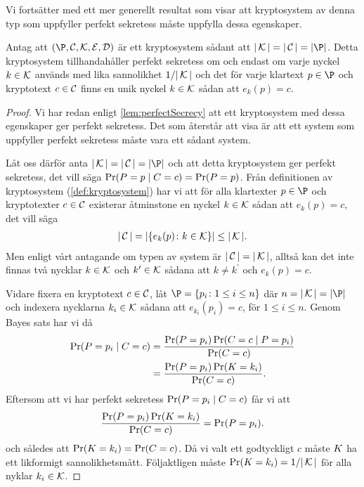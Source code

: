 Vi fortsätter med ett mer generellt resultat som visar att kryptosystem av 
denna typ som uppfyller perfekt sekretess måste uppfylla dessa egenskaper.
\begin{theorem}\label{thm:perfectSecrecy}
  Antag att \((\P, \C, \K, \E, \D)\) är ett kryptosystem sådant att \(|\K| 
  = |\C| = |\P|\).
  Detta kryptosystem tillhandahåller perfekt sekretess om och endast om
  varje nyckel \(k\in \operatorname{\mathcal{K}}\) används med lika sannolikhet \(1/|\operatorname{\mathcal{K}}|\) och det för 
  varje klartext \(p\in \P\) och kryptotext \(c\in \operatorname{\mathcal{C}}\) finns en unik nyckel 
  \(k\in \operatorname{\mathcal{K}}\) sådan att \(e_k(p) = c\).
\end{theorem}
\begin{proof}
  Vi har redan enligt \cref{lem:perfectSecrecy} att ett kryptosystem med 
  dessa egenskaper ger perfekt sekretess.
  Det som återstår att visa är att ett system som uppfyller perfekt sekretess 
  måste vara ett sådant system.

  Låt oss därför anta \(|\K| = |\C| = |\P|\) och att detta kryptosystem ger 
  perfekt sekretess, det vill säga \(\Pr(\relax{P} = p\mid \relax{C} = c) = \Pr(\relax{P} = p)\).
  Från definitionen av kryptosystem (\cref{def:kryptosystem}) har vi att 
  för alla klartexter \(p\in \P\) och kryptotexter \(c\in \operatorname{\mathcal{C}}\) existerar 
  åtminstone en nyckel \(k\in \operatorname{\mathcal{K}}\) sådan att \(e_k(p) = c\), det vill säga
  \begin{align}
    \nonumber
    |\operatorname{\mathcal{C}}| = |\{e_k(p)\colon k\in \operatorname{\mathcal{K}}\}|\leq |\operatorname{\mathcal{K}}|.
  \end{align}
  Men enligt vårt antagande om typen av system är \(|\operatorname{\mathcal{C}}| = |\operatorname{\mathcal{K}}|\), alltså kan 
  det inte finnas två nycklar \(k\in \operatorname{\mathcal{K}}\) och \(k^\prime\in \operatorname{\mathcal{K}}\) sådana att 
  \(k\neq k^\prime\) och \(e_k(p) = c\).

  Vidare fixera en kryptotext \(c\in \operatorname{\mathcal{C}}\), låt \(\P = \{p_i\colon 1\leq i\leq 
  n\}\) där \(n = |\K| = |\P|\) och indexera nycklarna \(k_i\in \operatorname{\mathcal{K}}\) sådana att 
  \(e_{k_i}(p_i) = c\), för \(1\leq i\leq n\).
  Genom Bayes sats har vi då
  \begin{align}
    \nonumber
    \Pr(\relax{P} = p_i\mid \relax{C} = c) &= \frac{\Pr(\relax{P} = p_i)\Pr(\relax{C} = c\mid \relax{P} 
    = p_i)}{\Pr(\relax{C} = c)} \\
    \nonumber
      &= \frac{\Pr(\relax{P} = p_i)\Pr(\relax{K} = k_i)}{\Pr(\relax{C} = c)}.
  \end{align}
  Eftersom att vi har perfekt sekretess \(\Pr(\relax{P} = p_i\mid \relax{C} = c)\) får vi att
  \begin{align}
    \nonumber
    \frac{\Pr(\relax{P} = p_i)\Pr(\relax{K} = k_i)}{\Pr(\relax{C} = c)} = \Pr(\relax{P} = p_i).
  \end{align}
  och således att \(\Pr(\relax{K} = k_i) = \Pr(\relax{C} = c)\).
  Då vi valt ett godtyckligt \(c\) måste \(\relax{K}\) ha ett likformigt 
  sannolikhetsmått.
  Följaktligen måste \(\Pr(\relax{K} = k_i) = 1/|\operatorname{\mathcal{K}}|\) för alla nyklar \(k_i\in \operatorname{\mathcal{K}}\).
\end{proof}

